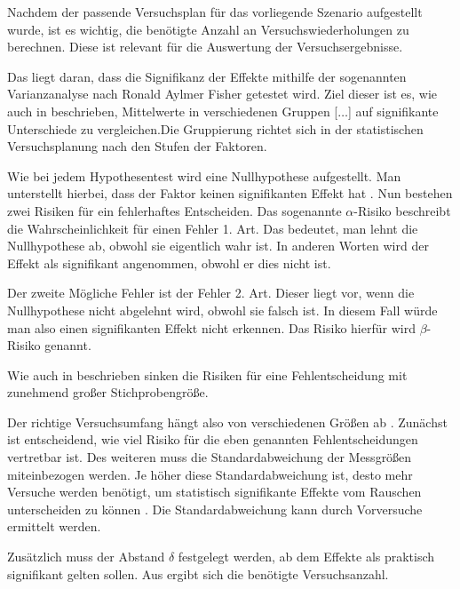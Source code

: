 Nachdem der passende Versuchsplan für das vorliegende Szenario aufgestellt wurde, ist es wichtig, die benötigte Anzahl an Versuchswiederholungen zu berechnen. Diese ist relevant für die Auswertung der Versuchsergebnisse.

Das liegt daran, dass die Signifikanz der Effekte mithilfe der sogenannten Varianzanalyse nach Ronald Aylmer Fisher getestet wird. Ziel dieser ist es, wie auch in \citet{Siebertz2016} beschrieben, \glqq Mittelwerte in verschiedenen Gruppen [$\dots$] auf signifikante Unterschiede zu vergleichen.\grqq Die Gruppierung richtet sich in der statistischen Versuchsplanung nach den Stufen der Faktoren.

Wie bei jedem Hypothesentest wird eine Nullhypothese aufgestellt. Man unterstellt hierbei, dass der Faktor keinen signifikanten Effekt hat \cite{Siebertz2016}.
Nun bestehen zwei Risiken für ein fehlerhaftes Entscheiden. Das sogenannte $\alpha$-Risiko beschreibt die Wahrscheinlichkeit für einen Fehler 1. Art. Das bedeutet, man lehnt die Nullhypothese ab, obwohl sie eigentlich wahr ist. In anderen Worten wird der Effekt als signifikant angenommen, obwohl er dies nicht ist.

Der zweite Mögliche Fehler ist der Fehler 2. Art. Dieser liegt vor, wenn die Nullhypothese nicht abgelehnt wird, obwohl sie falsch ist. In diesem Fall würde man also einen signifikanten Effekt nicht erkennen. Das Risiko hierfür wird $\beta$-Risiko genannt.

Wie auch in \citet{Siebertz2016} beschrieben sinken die Risiken für eine Fehlentscheidung mit zunehmend großer Stichprobengröße.

Der richtige Versuchsumfang hängt also von verschiedenen Größen ab \cite{Siebertz2016}. Zunächst ist entscheidend, wie viel Risiko für die eben genannten Fehlentscheidungen vertretbar ist. Des weiteren muss die Standardabweichung der Messgrößen miteinbezogen werden. Je höher diese Standardabweichung ist, desto mehr Versuche werden benötigt, um statistisch signifikante Effekte vom Rauschen unterscheiden zu können \cite{Siebertz2016}. Die Standardabweichung kann durch Vorversuche ermittelt werden.

Zusätzlich muss der Abstand $\delta$ festgelegt werden, ab dem Effekte als praktisch signifikant gelten \cite{Siebertz2016} sollen. Aus  ergibt sich die benötigte Versuchsanzahl.






